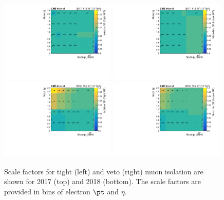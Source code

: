 \begin{figure}[ht!]
    \begin{center}
        \includegraphics[width=0.49\textwidth]{fig/efficiency/lepton/muon_eff_tight_iso_2017.pdf}
        \includegraphics[width=0.49\textwidth]{fig/efficiency/lepton/muon_eff_loose_iso_2017.pdf}\\
        \includegraphics[width=0.49\textwidth]{fig/efficiency/lepton/muon_eff_tight_iso_2018.pdf}
        \includegraphics[width=0.49\textwidth]{fig/efficiency/lepton/muon_eff_loose_iso_2018.pdf}
        \caption{
            Scale factors for tight (left) and veto (right) muon isolation are shown for 2017 (top) and
            2018 (bottom). The scale factors are provided in bins of electron $\pt$ and $\eta$.
          }
      \label{fig:sf_muon_iso}
    \end{center}
  \end{figure}

